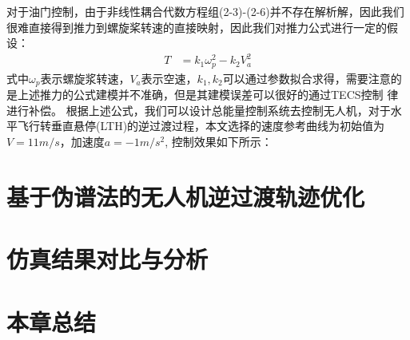 对于油门控制，由于非线性耦合代数方程组(2-3)-(2-6)并不存在解析解，因此我们很难直接得到推力到螺旋桨转速的直接映射，因此我们对推力公式进行一定的假设：
\begin{align}
    T & = k_{1} \omega_{p}^{2}-k_{2} V_{a}^{2}
\end{align}
式中$\omega_{p}$表示螺旋浆转速，$V_{a}$表示空速，$k_{1},k_{2}$可以通过参数拟合求得，需要注意的是上述推力的公式建模并不准确，但是其建模误差可以很好的通过TECS控制
律进行补偿\cite{argyle2016modeling}。
根据上述公式，我们可以设计总能量控制系统去控制无人机，对于水平飞行转垂直悬停(LTH)的逆过渡过程，本文选择的速度参考曲线为初始值为$V=11 m/s$，加速度$a=-1 m/s^{2}$,
控制效果如下所示：

\section{基于伪谱法的无人机逆过渡轨迹优化}



\section{仿真结果对比与分析}

\section{本章总结}

